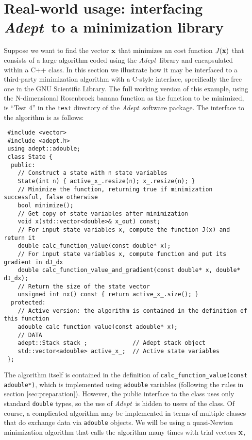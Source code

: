 \documentclass[a4,oneside]{book}
\def\codesize{\small}
\def\x{\ensuremath{{\bf x}}}
\def\Adept{\emph{Adept}}
\def\code#1{{\codesize\texttt{#1}}}
\begin{document}
\section{Real-world usage: interfacing \Adept\ to a minimization library}
\label{sec:realworld}
Suppose we want to find the vector $\x$ that minimizes an cost function
$J(\x)$ that consists of a large algorithm coded using the
\Adept\ library and encapsulated within a C++ class.  In this section
we illustrate how it may be interfaced to a third-party minimization
algorithm with a C-style interface, specifically the free one in the
GNU Scientific Library.  The full working version of this example,
using the N-dimensional Rosenbrock banana function as the function to
be minimized, is ``Test 4'' in the \code{test} directory of the
\Adept\ software package. The interface to the algorithm is as
follows:
%
\begin{lstlisting}
 #include <vector>
 #include <adept.h>
 using adept::adouble;
 class State {
  public:
    // Construct a state with n state variables
    State(int n) { active_x_.resize(n); x_.resize(n); }
    // Minimize the function, returning true if minimization successful, false otherwise
    bool minimize();
    // Get copy of state variables after minimization
    void x(std::vector<double>& x_out) const;
    // For input state variables x, compute the function J(x) and return it
    double calc_function_value(const double* x);
    // For input state variables x, compute function and put its gradient in dJ_dx
    double calc_function_value_and_gradient(const double* x, double* dJ_dx);
    // Return the size of the state vector
    unsigned int nx() const { return active_x_.size(); }
  protected:
    // Active version: the algorithm is contained in the definition of this function
    adouble calc_function_value(const adouble* x);
    // DATA
    adept::Stack stack_;             // Adept stack object
    std::vector<adouble> active_x_;  // Active state variables
 };
\end{lstlisting}
%
The algorithm itself is contained in the definition of
\code{calc\_function\_value(const adouble*)}, which is implemented using
\code{adouble} variables (following the rules in section
\ref{sec:preparation}). However, the public interface to the class
uses only standard \code{double} types, so the use of \Adept\ is
hidden to users of the class.  Of course, a complicated algorithm may
be implemented in terms of multiple classes that do exchange data via
\code{adouble} objects. We will be using a quasi-Newton minimization
algorithm that calls the algorithm many times with trial vectors $\x$,
\end{document}
